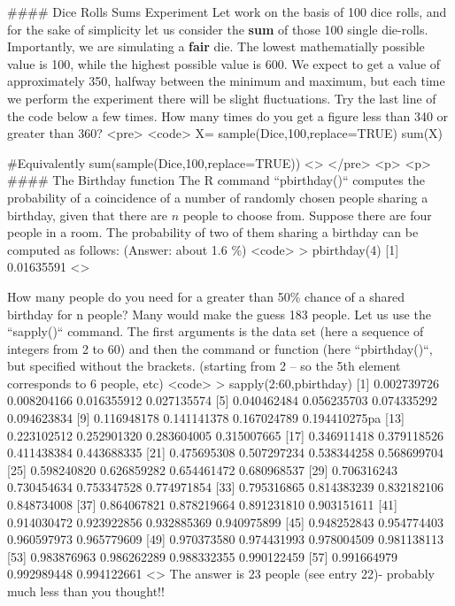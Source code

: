 #### {Dice Rolls Sums Experiment}
Let work on the basis of 100 dice rolls, and for the sake of simplicity let us consider the \textbf{sum} of those 100 single die-rolls. Importantly, we are simulating a \textbf{fair} die. The lowest mathematially possible value is 100, while the highest possible value is 600. We expect to get a value of approximately 350, halfway between the minimum and maximum, but each time we perform the experiment there will be slight fluctuations.  Try the last line of the code below a few times. How many times do you get a figure less than 340 or greater than 360?
<pre>
<code>
X= sample(Dice,100,replace=TRUE)
sum(X)

#Equivalently
sum(sample(Dice,100,replace=TRUE))
<\code>
</pre>
<p>
<p>
#### {The Birthday function}
The R command ``pbirthday()`` computes the probability of a coincidence of a number of randomly chosen people sharing a birthday, given that there are $n$ people to choose from.
Suppose there are four people in a room. The probability of two of them sharing a birthday can be computed as follows: (Answer:  about 1.6 \%)
<code>
> pbirthday(4)
[1] 0.01635591
<\code>



\noindent How many people do you need for a greater than 50\% chance of a shared birthday for n people? Many would make the guess 183 people.  Let us use the ``sapply()`` command. The first arguments is the data set (here a sequence of integers from 2 to 60) and then the command or function (here ``pbirthday()``, but specified without the brackets.
(starting from 2 – so the 5th element corresponds to 6 people, etc)
<code>
 > sapply(2:60,pbirthday)
 [1] 0.002739726 0.008204166 0.016355912 0.027135574
 [5] 0.040462484 0.056235703 0.074335292 0.094623834
 [9] 0.116948178 0.141141378 0.167024789 0.194410275pa
[13] 0.223102512 0.252901320 0.283604005 0.315007665
[17] 0.346911418 0.379118526 0.411438384 0.443688335
[21] 0.475695308 0.507297234 0.538344258 0.568699704
[25] 0.598240820 0.626859282 0.654461472 0.680968537
[29] 0.706316243 0.730454634 0.753347528 0.774971854
[33] 0.795316865 0.814383239 0.832182106 0.848734008
[37] 0.864067821 0.878219664 0.891231810 0.903151611
[41] 0.914030472 0.923922856 0.932885369 0.940975899
[45] 0.948252843 0.954774403 0.960597973 0.965779609
[49] 0.970373580 0.974431993 0.978004509 0.981138113
[53] 0.983876963 0.986262289 0.988332355 0.990122459
[57] 0.991664979 0.992989448 0.994122661
<\code>
The answer is 23 people (see entry 22)- probably much less than you thought!!





